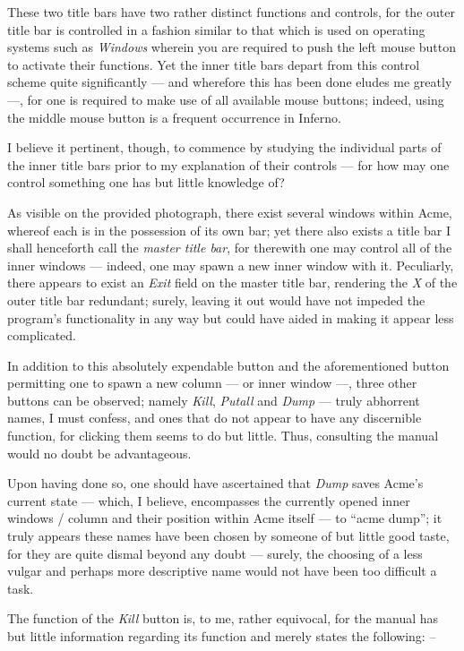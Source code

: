 \documentclass[a5paper,twoside,12pt]{report}
\begin{document}
   These two title bars have two rather distinct functions and controls, for the outer title bar is controlled in a fashion similar to that which is used on operating systems such as \textit{Windows} wherein you are required to push the left mouse button to activate their functions. Yet the inner title bars depart from this control scheme quite significantly — and wherefore this has been done eludes me greatly —, for one is required to make use of all available mouse buttons; indeed, using the middle mouse button is a frequent occurrence in Inferno.

   I believe it pertinent, though, to commence by studying the individual parts of the inner title bars prior to my explanation of their controls — for how may one control something one has but little knowledge of?

  As visible on the provided photograph, there exist several windows within Acme, whereof each is in the possession of its own bar; yet there also exists a title bar I shall henceforth call the \textit{master title bar}, for therewith one may control all of the inner windows — indeed, one may spawn a new inner window with it. Peculiarly, there appears to exist an \textit{Exit} field on the master title bar, rendering the \textit{X} of the outer title bar redundant; surely, leaving it out would have not impeded the program's functionality in any way but could have aided in making it appear less complicated.

  In addition to this absolutely expendable button and the aforementioned button permitting one to spawn a new column — or inner window —, three other buttons can be observed; namely \textit{Kill}, \textit{Putall} and \textit{Dump} — truly abhorrent names, I must confess, and ones that do not appear to have any discernible function, for clicking them seems to do but little. Thus, consulting the manual would no doubt be advantageous. 

  Upon having done so, one should have ascertained that \textit{Dump} saves Acme's current state — which, I believe, encompasses the currently opened inner windows / column and their position within Acme itself — to ``acme dump''; it truly appears these names have been chosen by someone of but little good taste, for they are quite dismal beyond any doubt — surely, the choosing of a less vulgar and perhaps more descriptive name would not have been too difficult a task.

  The function of the \textit{Kill} button is, to me, rather equivocal, for the manual has but little information regarding its function and merely states the following: –
\end{document}
